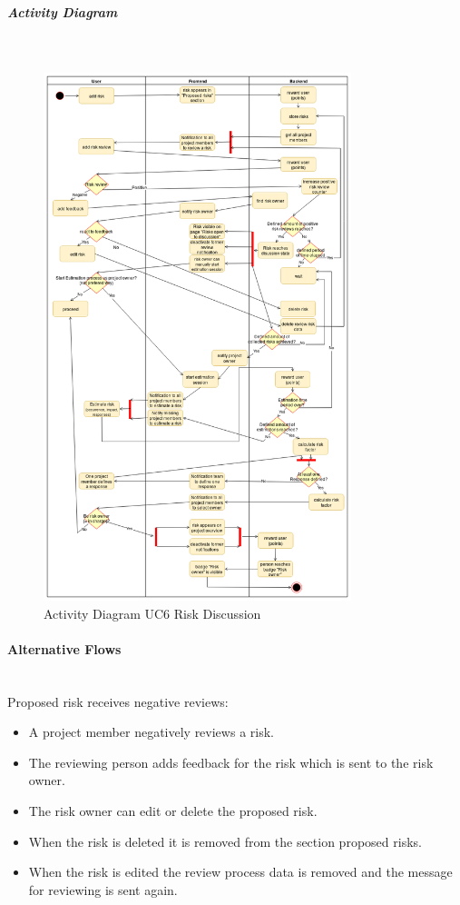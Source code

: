 \subparagraph{Activity Diagram}\mbox{}\\
\begin{figure}[!hp]
	\centering
	\includegraphics[width=0.8\textwidth]{Content/Domain/UC6RiskDiscussion.png}
	\caption{Activity Diagram \ac{UC}6 Risk Discussion}
	\label{fig:label66}
\end{figure}

\newpage

\paragraph*{Alternative Flows}\mbox{}\\

\noindent
Proposed risk receives negative reviews:
\begin{itemize}
	\vspace{-3mm}
	\setlength\itemsep{-1em}
	
	\item A project member negatively reviews a risk.
	\item The reviewing person adds feedback for the risk which is sent to the risk owner.
	\item The risk owner can edit or delete the proposed risk.
	\item When the risk is deleted it is removed from the section proposed risks.
	\item When the risk is edited the review process data is removed and the message for reviewing is sent again.
\end{itemize}

